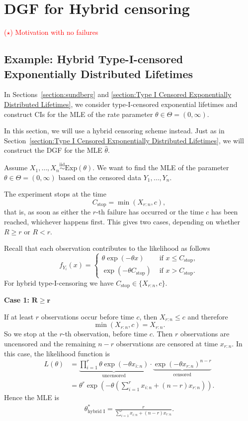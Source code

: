 \section{DGF for Hybrid censoring}
\textcolor{red}{($\star$) Motivation with no failures}

\subsection{Example: Hybrid Type-I-censored Exponentially Distributed Lifetimes}

In Sections~\ref{section:sundberg} and \ref{section:Type I Censored Exponentially Distributed Lifetimes}, we consider type-I-censored exponential lifetimes and construct CIs for the MLE of the rate parameter \(\theta\in\Theta=(0,\infty)\).

In this section, we will use a hybrid censoring scheme instead. Just as in Section~\ref{section:Type I Censored Exponentially Distributed Lifetimes}, we will construct the DGF for the MLE $\hat \theta$.


Assume $X_1, \ldots, X_n \overset{\text{iid}}{\sim} \text{Exp}(\theta)$. We want to find the MLE of the parameter $\theta \in \Theta = (0, \infty)$ based on the censored data $Y_1, \ldots, Y_n$. 


The experiment stops at the time
\[
C_{\text{stop}} = \min \left( X_{r:n}, c \right),
\]
that is, as soon as either the $r$-th failure has occurred or the time $c$ has been reached, whichever happens first. 
This gives two cases, depending on whether $R \geq r$ or $R < r$.

Recall that each observation contributes to the likelihood as follows
\[
f_{Y_i} (x) = 
\begin{cases}
	\theta \exp(- \theta x) & \text{ if } x \leq C_{\text{stop}}, \\
	\exp(- \theta C_{\text{stop}}) & \text{ if } x > C_{\text{stop}}.
\end{cases}
\]
For hybrid type-I-censoring we have $C_{\text{stop}} \in \{X_{r:n}, c\}$.

\textbf{Case 1:} $\mathbf{R \geq r}$

If at least $r$ observations occur before time $c$, then $X_{r:n} \leq c$ and therefore
\[
\min \left( X_{r:n}, c \right) = X_{r:n}.
\]
So we stop at the $r$-th observation, before time $c$. 
Then $r$ observations are uncensored and the remaining $n - r$ observations are censored at time $x_{r:n}$. 
In this case, the likelihood function is
\begin{align*}
	L(\theta) 
	&=
	\underbrace{ \prod_{i=1}^r \theta \exp \left( - \theta x_{i:n} \right)}_{\text{uncensored}} \cdot \underbrace{\exp(- \theta x_{r:n})^{n-r}}_{\text{censored}} \\
	&=
	\theta^r \exp \left( - \theta \left(  \sum_{i = 1}^r x_{i:n} + (n-r) x_{r:n} \right) \right).
\end{align*}
Hence the MLE is
\begin{align*}
	\theta^\ast_{\text{hybrid I}} = \frac{r}{\sum_{i = 1}^r x_{i:n} + (n-r) x_{r:n}}.
\end{align*}

